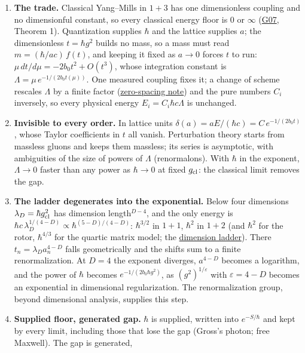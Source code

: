 \documentclass[11pt,a4paper]{article}
\newcommand{\tightlist}{\setlength{\itemsep}{0pt}\setlength{\parskip}{0pt}}
\begin{document}
\begin{enumerate}
\def\labelenumi{\arabic{enumi}.}
\tightlist
\item
  \textbf{The trade.} Classical Yang--Mills in \(1+3\) has one
  dimensionless coupling and no dimensionful constant, so every
  classical energy floor is \(0\) or \(\infty\)
  (\href{low-dimensional-mass-gap.md}{G07}, Theorem 1). Quantization
  supplies \(\hbar\) and the lattice supplies \(a\); the dimensionless
  \(t=\hbar g^2\) builds no mass, so a mass must read
  \(m=(\hbar/ac)\,f(t)\), and keeping it fixed as \(a\to0\) forces \(t\)
  to run: \(\mu\,dt/d\mu=-2b_0t^2+O(t^3)\), whose integration constant
  is \(\Lambda=\mu\,e^{-1/(2b_0t(\mu))}\). One measured coupling fixes
  it; a change of scheme rescales \(\Lambda\) by a finite factor
  (\href{zero-spacing-any-action.md}{zero-spacing note}) and the pure
  numbers \(C_i\) inversely, so every physical energy
  \(E_i=C_i\hbar c\Lambda\) is unchanged.
\item
  \textbf{Invisible to every order.} In lattice units
  \(\delta(a)=aE/(\hbar c)=C\,e^{-1/(2b_0t)}\), whose Taylor
  coefficients in \(t\) all vanish. Perturbation theory starts from
  massless gluons and keeps them massless; its series is asymptotic,
  with ambiguities of the size of powers of \(\Lambda\) (renormalons).
  With \(\hbar\) in the exponent, \(\Lambda\to0\) faster than any power
  as \(\hbar\to0\) at fixed \(g_{\rm cl}\): the classical limit removes
  the gap.
\item
  \textbf{The ladder degenerates into the exponential.} Below four
  dimensions \(\lambda_D=\hbar g_{\rm cl}^2\) has dimension
  length\(^{D-4}\), and the only energy is
  \(\hbar c\,\lambda_D^{1/(4-D)}\propto\hbar^{(5-D)/(4-D)}\):
  \(\hbar^{3/2}\) in \(1+1\), \(\hbar^2\) in \(1+2\) (and \(\hbar^2\)
  for the rotor, \(\hbar^{4/3}\) for the quartic matrix model; the
  \href{dimension-ladder.md}{dimension ladder}). There
  \(t_n=\lambda_Da_n^{4-D}\) falls geometrically and the shifts sum to a
  finite renormalization. At \(D=4\) the exponent diverges, \(a^{4-D}\)
  becomes a logarithm, and the power of \(\hbar\) becomes
  \(e^{-1/(2b_0\hbar g^2)}\), as \((g^2)^{1/\varepsilon}\) with
  \(\varepsilon=4-D\) becomes an exponential in dimensional
  regularization. The renormalization group, beyond dimensional
  analysis, supplies this step.
\item
  \textbf{Supplied floor, generated gap.} \(\hbar\) is supplied, written
  into \(e^{-S/\hbar}\) and kept by every limit, including those that
  lose the gap (Gross's photon; free Maxwell). The gap is generated,

\end{enumerate}
\end{document}
